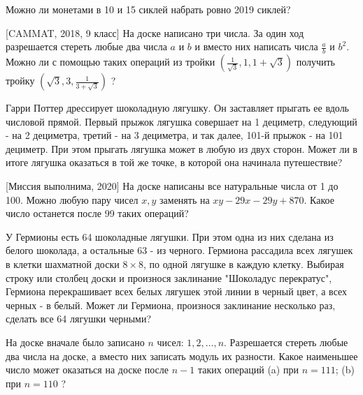 
Можно ли монетами в 10 и 15 сиклей набрать ровно 2019 сиклей?

[CAMMAT, 2018, 9 класс] На доске написано три числа. За один ход разрешается стереть любые два числа $a$ и $b$ и вместо них написать числа $\frac{a}{b}$ и $b^2$. Можно ли с помощью таких операций из тройки $\left(\frac{1}{\sqrt{3}}, 1,1+\sqrt{3}\right)$ получить тройку $\left(\sqrt{3}, 3, \frac{1}{3+\sqrt{3}}\right)$ ?

Гарри Поттер дрессирует шоколадную лягушку. Он заставляет прыгать ее вдоль числовой прямой. Первый прыжок лягушка совершает на 1 дециметр, следующий - на 2 дециметра, третий - на 3 дециметра, и так далее, 101-й прыжок - на 101 дециметр. При этом прыгать лягушка может в любую из двух сторон. Может ли в итоге лягушка оказаться в той же точке, в которой она начинала путешествие?

[Миссия выполнима, 2020] На доске написаны все натуральные числа от 1 до 100. Можно любую пару чисел $x, y$ заменять на $x y-29 x-29 y+870$. Какое число останется после 99 таких операций?


У Гермионы есть 64 шоколадные лягушки. При этом одна из них сделана из белого шоколада, а остальные 63 - из черного. Гермиона рассадила всех лягушек в клетки шахматной доски $8 \times 8$, по одной лягушке в каждую клетку. Выбирая строку или столбец доски и произнося заклинание "Шоколадус перекратус", Гермиона перекрашивает всех белых лягушек этой линии в черный цвет, а всех черных - в белый. Может ли Гермиона, произнося заклинание несколько раз, сделать все 64 лягушки черными?

На доске вначале было записано $n$ чисел: $1,2, \ldots, n$. Разрешается стереть любые два числа на доске, а вместо них записать модуль их разности. Какое наименьшее число может оказаться на доске после $n-1$ таких операций (a) при $n=111$; (b) при $n=110$ ?